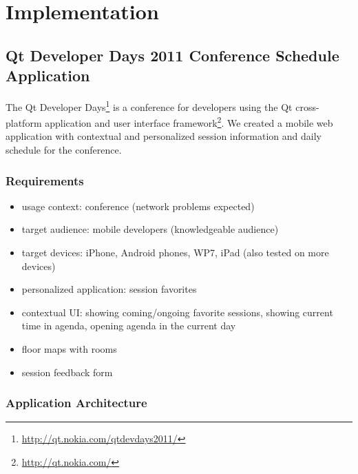 \chapter{Implementation}
\label{chapter:methods}

\section{Qt Developer Days 2011 Conference Schedule Application}
\label{section:devdays}

The Qt Developer
Days\footnote{\url{http://qt.nokia.com/qtdevdays2011/}} is a
conference for developers using the Qt cross-platform application and
user interface framework\footnote{\url{http://qt.nokia.com/}}. We
created a mobile web application with contextual and personalized
session information and daily schedule for the conference.

\subsection{Requirements}

\begin{itemize}
\item usage context: conference (network problems expected)
\item target audience: mobile developers (knowledgeable audience)
\item target devices: iPhone, Android phones, WP7, iPad (also tested
  on more devices)
\item personalized application: session favorites
\item contextual UI: showing coming/ongoing favorite sessions, showing
  current time in agenda, opening agenda in the current day
\item floor maps with rooms
\item session feedback form
\end{itemize}

\subsection{Application Architecture}

